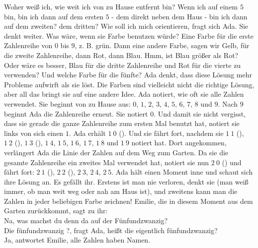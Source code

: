 Woher weiß ich, wie weit ich von zu Hause entfernt bin? Wenn ich auf einem $5$ bin, bin ich dann auf dem ersten $5$ - dem direkt neben dem Haus - bin ich dann auf dem zweiten? dem dritten? Wie soll ich mich orientieren, fragt sich Ada.
Sie denkt weiter. Was wäre, wenn sie Farbe benutzen würde? 
Eine Farbe für die erste Zahlenreihe von $0$ bis $9$, z. B. grün. Dann eine andere Farbe, sagen wir Gelb, für die zweite Zahlenreihe, dann Rot, dann Blau. Hmm, ist Blau größer als Rot? Oder wäre es besser, Blau für die dritte Zahlenreihe und Rot für die vierte zu verwenden? Und welche Farbe für die fünfte? Ada denkt, dass diese Lösung mehr Probleme aufwirft als sie löst.  
Die Farben sind vielleicht nicht die richtige Lösung, aber all das bringt sie auf eine andere Idee. Ada notiert, wie oft sie alle Zahlen verwendet. Sie beginnt von zu Hause aus: $0$, $1$, $2$, $3$, $4$, $5$, $6$, $7$, $8$ und $9$. Nach $9$ beginnt Ada die Zahlenreihe erneut. Sie notiert $0$. Und damit sie nicht vergisst, dass sie gerade die ganze Zahlenreihe zum ersten Mal benutzt hat, notiert sie links von sich einen $1$. Ada erhält $1~0$ (). Und sie fährt fort, nachdem sie $1~1$ (), $1~2$ (), $1~3$ (), $1~4$, $1~5$, $1~6$, $1~7$, $1~8$ und $1~9$ notiert hat. 
Dort angekommen, verlängert Ada die Linie der Zahlen auf dem Weg zum Garten. 
Da sie die gesamte Zahlenreihe ein zweites Mal verwendet hat, notiert sie nun $2~0$ () und fährt fort: $2~1$ (), $2~2$ (), $2~3$, $2~4$, $2~5$. 
Ada hält einen Moment inne und schaut sich ihre Lösung an. Es gefällt ihr. Erstens ist man nie verloren, denkt sie (man weiß immer, ob man weit weg oder nah am Haus ist), und zweitens kann man die Zahlen in jeder beliebigen Farbe zeichnen! 
Emilie, die in diesem Moment aus dem Garten zurückkommt, sagt zu ihr:\\
\frqq{}Na, was machst du denn da auf der Fünfundzwanzig?\flqq{}\\
\frqq{}Die fünfundzwanzig ?\flqq{}, fragt Ada, \frqq{}heißt die  eigentlich fünfundzwanzig?\flqq{}\\
\frqq{}Ja\flqq{}, antwortet Emilie, \frqq{}alle Zahlen haben Namen.\flqq{}\\

